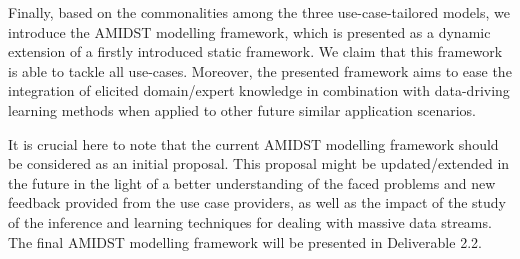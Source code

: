 
Finally, based on the commonalities among the three use-case-tailored models, we introduce the AMIDST modelling framework, which is presented as a dynamic extension of a firstly introduced static framework. We claim that this framework is able to tackle all use-cases. Moreover, the presented framework aims to ease the integration of elicited domain/expert knowledge in combination with data-driving learning methods when applied to other future similar application scenarios. 


It is crucial here to note that the current AMIDST modelling framework should be considered as an initial proposal. This proposal might be updated/extended in the future in the light of a better understanding of the faced problems and new feedback provided from the use case providers, as well as the impact of the study of the inference and learning techniques for dealing with massive data streams. The final AMIDST modelling framework will be presented in Deliverable 2.2.


